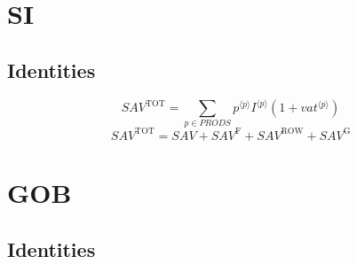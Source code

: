 \section{SI}

\subsection{Identities}

\begin{equation}
{S\!A\!V}^{\mathrm{TOT}} = \sum_{p\in {P\!R\!O\!D\!S}} {{p}^{\langle p\rangle}} {{I}^{\langle p\rangle}} \left(1 + {{v\!a\!t}}^{\langle p\rangle}\right)
\end{equation}
\begin{equation}
{S\!A\!V}^{\mathrm{TOT}} = {S\!A\!V} + {S\!A\!V}^{\mathrm{F}} + {S\!A\!V}^{\mathrm{ROW}} + {S\!A\!V}^{\mathrm{G}}
\end{equation}




\section{GOB}

\subsection{Identities}

